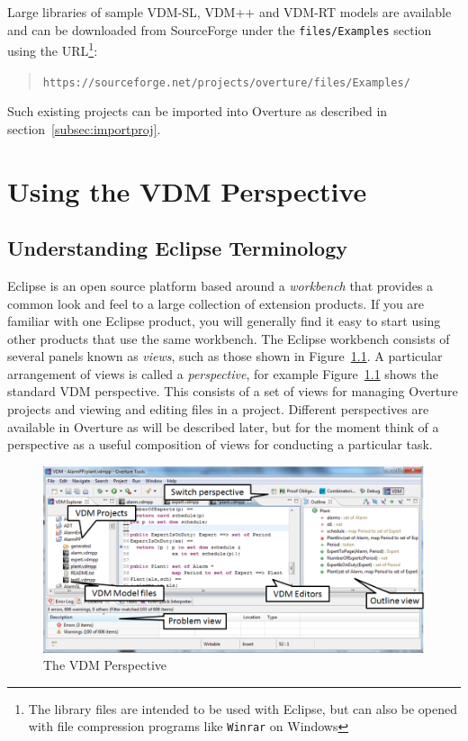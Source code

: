 \documentclass{overturerepchap}
\newcommand{\url}[1]{\texttt{#1}}
\begin{document}
Large libraries of sample VDM-SL, VDM++ and VDM-RT models are available
and can be downloaded from SourceForge under the
\texttt{files/Examples} section using the URL\footnote{The library
  files are intended to be used with Eclipse, but can also be opened with
  file compression programs like \texttt{Winrar} on Windows}:
\begin{quote}
\url{https://sourceforge.net/projects/overture/files/Examples/}
\end{quote}
Such existing projects can be imported into Overture as described in
section~\ref{subsec:importproj}. 

\chapter{Using the VDM Perspective}\label{sec:vdmsupport}

\section{Understanding Eclipse Terminology}

Eclipse is an open source platform based around a
\emph{workbench} that provides a common look and feel
to a large collection of extension products. If you are
familiar with one Eclipse product, you will generally find it easy to start
using other products that use the same workbench. The Eclipse workbench
consists of several panels known as \emph{views}, such as
those shown in Figure~\ref{fig:userguire:OverturePerspective}.
A particular arrangement of views
is called a \emph{perspective}, for example
Figure~\ref{fig:userguire:OverturePerspective} shows the standard
VDM perspective. This consists of a set of views for managing
Overture projects and viewing and editing files in a
project. Different perspectives are available in Overture as will be
described later, but for the moment think of a perspective as a
useful composition of views for conducting a particular task.

\begin{figure}[!h]
\begin{center}
  \includegraphics[width=\textwidth]{figures/OverturePerspective}
  \caption[labelInTOC]{The VDM Perspective}
  \label{fig:userguire:OverturePerspective}
\end{center}
\end{figure}
\end{document}

